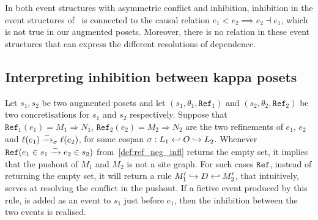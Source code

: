 \begin{remark}
  In both event structures with asymmetric conflict and inhibition, inhibition in the event structures of~\cite{BaldanThesis} is connected to the causal relation $e_1 < e_2 \implies e_2\dashv e_1$, which is not true in our augmented posets. Moreover, there is no relation in these event structures that can express the different resolutions of dependence.
\end{remark}

\subsection{Interpreting inhibition between kappa posets}
  Let $s_1,s_2$ be two augmented posets and let $(s_1,\theta_1,\mathtt{Ref}_1)$ and $(s_2,\theta_2,\mathtt{Ref}_2)$ be two concretisations for $s_1$ and $s_2$ respectively. Suppose that $\mathtt{Ref}_1(e_1) = M_1\Rightarrow N_1$, $\mathtt{Ref}_2(e_2) = M_2\Rightarrow N_2$ are the two refinements of $e_1$, $e_2$ and $\ell(e_1)\mathrel{\xrightarrow{-}}_{\sigma}\ell(e_2)$, for some cospan $\sigma:L_1\hookleftarrow O\hookrightarrow L_2$.
  Whenever $\mathtt{Ref}(e_1\in s_1\mathrel{\xrightarrow{-}} e_2\in s_2)$ from~\autoref{def:ref_neg_infl} returns the empty set, it implies that the pushout of $M_1$ and $M_2$ is not a site graph. For such cases $\mathtt{Ref}$, instead of returning the empty set, it will return a rule $M_1'\hookrightarrow D\hookleftarrow M_2'$, that intuitively, serves at resolving the conflict in the pushout. If a fictive event produced by this rule, is added as an event to $s_1$ just before $e_1$, then the inhibition between the two events is realised.

